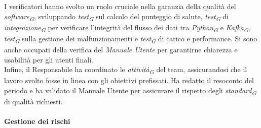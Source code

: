 I verificatori hanno svolto un ruolo cruciale nella garanzia della qualità del \textit{software}\textsubscript{\textit{G}}, sviluppando \textit{test}\textsubscript{\textit{G}} sul calcolo del punteggio di salute, \textit{test}\textsubscript{\textit{G}} di \textit{integrazione}\textsubscript{\textit{G}} per verificare l'integrità del flusso dei dati tra \textit{Python}\textsubscript{\textit{G}} e \textit{Kafka}\textsubscript{\textit{G}}, \textit{test}\textsubscript{\textit{G}} sulla gestione dei malfunzionamenti e \textit{test}\textsubscript{\textit{G}} di carico e performance. Si sono anche occupati della verifica del \textit{Manuale Utente} per garantirne chiarezza e usabilità per gli utenti finali. \\
Infine, il Responsabile ha coordinato le \textit{attività}\textsubscript{\textit{G}} del team, assicurandosi che il lavoro svolto fosse in linea con gli obiettivi prefissati. Ha redatto il resoconto del periodo e ha validato il Manuale Utente per assicurare il rispetto degli \textit{standard}\textsubscript{\textit{G}} di qualità richiesti.

\paragraph{Gestione dei rischi}

